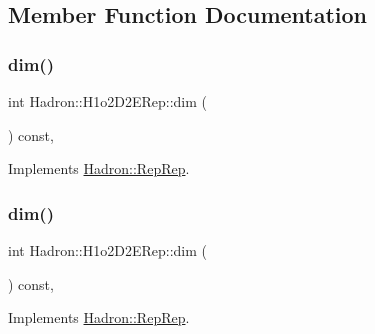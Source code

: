 \subsection{Member Function Documentation}
\mbox{\label{structHadron_1_1H1o2D2ERep_aeddb45f1ce47ceee776ea1714563280d}} 
\subsubsection{\texorpdfstring{dim()}{dim()}\hspace{0.1cm}{\footnotesize\ttfamily [1/5]}}
{\footnotesize\ttfamily int Hadron\+::\+H1o2\+D2\+E\+Rep\+::dim (\begin{DoxyParamCaption}{ }\end{DoxyParamCaption}) const\hspace{0.3cm}{\ttfamily [inline]}, {\ttfamily [virtual]}}



Implements \mbox{\hyperlink{structHadron_1_1RepRep_a92c8802e5ed7afd7da43ccfd5b7cd92b}{Hadron\+::\+Rep\+Rep}}.

\mbox{\label{structHadron_1_1H1o2D2ERep_aeddb45f1ce47ceee776ea1714563280d}} 
\subsubsection{\texorpdfstring{dim()}{dim()}\hspace{0.1cm}{\footnotesize\ttfamily [2/5]}}
{\footnotesize\ttfamily int Hadron\+::\+H1o2\+D2\+E\+Rep\+::dim (\begin{DoxyParamCaption}{ }\end{DoxyParamCaption}) const\hspace{0.3cm}{\ttfamily [inline]}, {\ttfamily [virtual]}}



Implements \mbox{\hyperlink{structHadron_1_1RepRep_a92c8802e5ed7afd7da43ccfd5b7cd92b}{Hadron\+::\+Rep\+Rep}}.

\mbox{\label{structHadron_1_1H1o2D2ERep_aeddb45f1ce47ceee776ea1714563280d}} 
